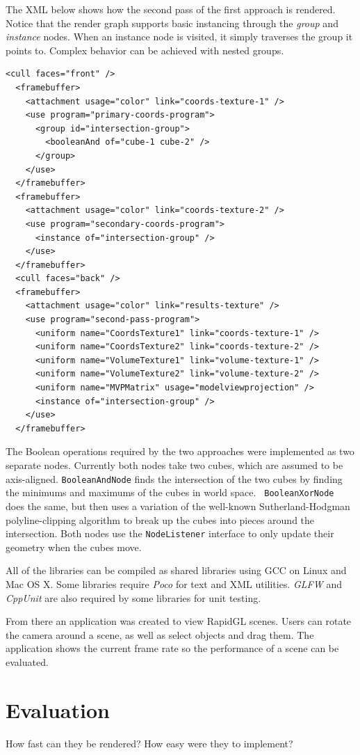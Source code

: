 \documentclass{article}
\begin{document}
The XML below shows how the second pass of the first approach is rendered.
Notice that the render graph supports basic instancing through the {\em group}
and {\em instance} nodes.  When an instance node is visited, it simply traverses
the group it points to.  Complex behavior can be achieved with nested groups.

\begin{Verbatim}[fontsize=\small]
  <cull faces="front" />
  <framebuffer>
    <attachment usage="color" link="coords-texture-1" />
    <use program="primary-coords-program">
      <group id="intersection-group">
        <booleanAnd of="cube-1 cube-2" />
      </group>
    </use>
  </framebuffer>
  <framebuffer>
    <attachment usage="color" link="coords-texture-2" />
    <use program="secondary-coords-program">
      <instance of="intersection-group" />
    </use>
  </framebuffer>
  <cull faces="back" />
  <framebuffer>
    <attachment usage="color" link="results-texture" />
    <use program="second-pass-program">
      <uniform name="CoordsTexture1" link="coords-texture-1" />
      <uniform name="CoordsTexture2" link="coords-texture-2" />
      <uniform name="VolumeTexture1" link="volume-texture-1" />
      <uniform name="VolumeTexture2" link="volume-texture-2" />
      <uniform name="MVPMatrix" usage="modelviewprojection" />
      <instance of="intersection-group" />
    </use>
  </framebuffer>
\end{Verbatim}

The Boolean operations required by the two approaches were implemented as two
separate nodes.  Currently both nodes take two cubes, which are assumed to be
axis-aligned.  {\tt BooleanAndNode} finds the intersection of the two cubes by
finding the minimums and maximums of the cubes in world space.  {\tt
BooleanXorNode} does the same, but then uses a variation of the well-known
Sutherland-Hodgman polyline-clipping algorithm to break up the cubes into pieces
around the intersection.  Both nodes use the {\tt NodeListener} interface to
only update their geometry when the cubes move.

All of the libraries can be compiled as shared libraries using GCC on Linux and
Mac OS X.  Some libraries require {\em Poco} for text and XML utilities.  {\em
GLFW} and {\em CppUnit} are also required by some libraries for unit testing.

From there an application was created to view RapidGL scenes.  Users can
rotate the camera around a scene, as well as select objects and drag them.  The
application shows the current frame rate so the performance of a scene can be
evaluated.

\section{Evaluation}

How fast can they be rendered?
How easy were they to implement?


\newpage


\end{document}
